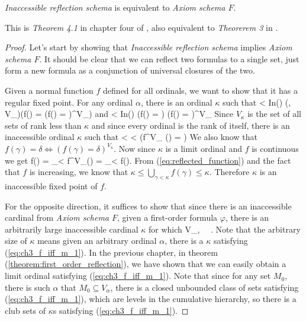 \begin{theorem}
\emph{Inaccessible reflection schema} is equivalent to \emph{Axiom schema $F$}.
\end{theorem}

This is \emph{Theorem 4.1} in chapter four of \cite{DrakeBook}, also equivalent to \emph{Theorerem 3} in \cite{Levy1960a}.
\begin{proof}
Let's start by showing that \emph{Inaccessible reflection schema} implies \emph{Axiom schema $F$}. 
It should be clear that we can reflect two formulas to a single set, just form a new formula as a conjunction of universal closures of the two.

Given a normal function $f$ defined for all ordinals, we want to show that it has a regular fixed point. 
For any ordinal $\alpha$, there is an ordinal $\kappa$ such that 
\beq
\alpha < \kappa \et In(\kappa) \et (\forall \gamma, \delta \in V_\kappa)(f(\gamma) = \delta \iff (f(\gamma) = \delta)^{V_\kappa})
\eeq
and
\beq
\alpha < \kappa \et In(\kappa) \et \forall \gamma \exists \delta (f(\gamma) = \delta) \iff (\forall \gamma \exists \delta f(\gamma) = \delta)^{V_\kappa}
\eeq
Since $V_\kappa$ is the set of all sets of rank less than $\kappa$ and since every ordinal is the rank of itself, there is an inaccessible ordinal $\kappa$ such that
\beq
\forall \gamma < \kappa \exists \delta < \kappa (f^{V_\kappa} (\gamma) = \delta)\label{eq:reflected_function}
\eeq
We also know that $f(\gamma) = \delta \iff (f(\gamma) = \delta)^{V_\kappa}$. 
Now since $\kappa$ is a limit ordinal and $f$ is continuous we get
\beq
f(\kappa) = \bigcup_{\gamma < \kappa} f^{V_\kappa}(\gamma) = \bigcup_{\gamma < \kappa} f(\gamma)\mbox{.}
\eeq
From (\ref{eq:reflected_function}) and the fact that $f$ is increasing, we know that $\kappa \leq \bigcup_{\gamma < \kappa} f(\gamma) \leq \kappa$. Therefore $\kappa$ is an inaccessible fixed point of $f$.

For the opposite direction, it suffices to show that since there is an inaccessible cardinal from \emph{Axiom schema $F$}, given a first-order formula $\varphi$, there is an arbitrarily large inaccessible cardinal $\kappa$ for which 
\beq
\varphi \iff \langle V_\kappa, \in \rangle~\models~\varphi\mbox{.}\label{eq:ch3_f_iff_m_1}
\eeq
Note that the arbitrary size of $\kappa$ means given an arbitrary ordinal $\alpha$, there is a $\kappa$ satisfying (\ref{eq:ch3_f_iff_m_1}).
In the previous chapter, in theorem (\ref{theorem:first_order_reflection}), we have shown that we can easily obtain a limit ordinal satisfying (\ref{eq:ch3_f_iff_m_1}). Note that since for any set $M_0$, there is such $\alpha$ that $M_0 \subseteq V_\alpha$, there is a closed unbounded class of sets satisfying (\ref{eq:ch3_f_iff_m_1}), which are levels in the cumulative hierarchy, so there is a club sets of $\kappa$s satisfying (\ref{eq:ch3_f_iff_m_1}).


\end{proof}
